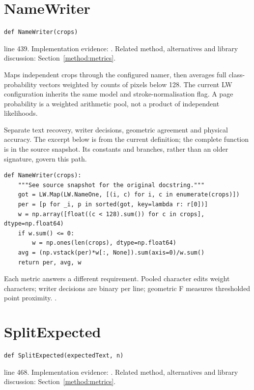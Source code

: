 \section{NameWriter}\label{fn:web-server:NameWriter}
\begin{lstlisting}[style=sig]
def NameWriter(crops)
\end{lstlisting}
 line 439. Implementation evidence: \cite{code2026}. Related method, alternatives and library discussion: Section~\ref{method:metrics}.


Maps independent crops through the configured namer, then averages full class-probability vectors weighted by counts of pixels below 128. The current LW configuration inherits the same model and stroke-normalisation flag. A page probability is a weighted arithmetic pool, not a product of independent likelihoods.


Separate text recovery, writer decisions, geometric agreement and physical accuracy. The excerpt below is from the current definition; the complete function is in the source snapshot. Its constants and branches, rather than an older signature, govern this path.


\begin{lstlisting}[style=plain]
def NameWriter(crops):
    """See source snapshot for the original docstring."""
    got = LW.Map(LW.NameOne, [(i, c) for i, c in enumerate(crops)])
    per = [p for _i, p in sorted(got, key=lambda r: r[0])]
    w = np.array([float((c < 128).sum()) for c in crops], dtype=np.float64)
    if w.sum() <= 0:
        w = np.ones(len(crops), dtype=np.float64)
    avg = (np.vstack(per)*w[:, None]).sum(axis=0)/w.sum()
    return per, avg, w
\end{lstlisting}
Each metric answers a different requirement. Pooled character edits weight characters; writer decisions are binary per line; geometric F measures thresholded point proximity. \cite{levenshtein1966,tanksmetric,nistinterval}.


\section{SplitExpected}\label{fn:web-server:SplitExpected}
\begin{lstlisting}[style=sig]
def SplitExpected(expectedText, n)
\end{lstlisting}
 line 468. Implementation evidence: \cite{code2026}. Related method, alternatives and library discussion: Section~\ref{method:metrics}.


